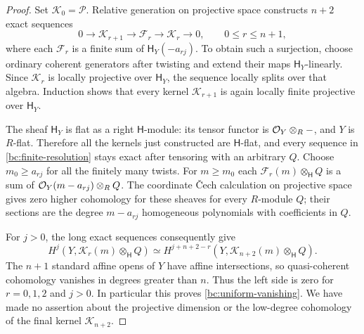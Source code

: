 \begin{proof}
Set $\mathcal K_0=\mathcal P$.  Relative generation on projective space
constructs $n+2$ exact sequences
\begin{equation}\label{bc:finite-resolution}
 0\longrightarrow\mathcal K_{r+1}\longrightarrow\mathcal F_r
   \longrightarrow\mathcal K_r\longrightarrow0,
 \qquad 0\le r\le n+1,
\end{equation}
where each $\mathcal F_r$ is a finite sum of $\mathsf H_Y(-a_{rj})$.
To obtain such a surjection, choose ordinary coherent generators after
twisting and extend their maps $\mathsf H_Y$-linearly.  Since
$\mathcal K_r$ is locally projective over $\mathsf H_Y$, the sequence
locally splits over that algebra.  Induction shows that every kernel
$\mathcal K_{r+1}$ is again locally finite projective over
$\mathsf H_Y$.

The sheaf $\mathsf H_Y$ is flat as a right $\mathsf H$-module: its tensor
functor is $\mathcal O_Y\otimes_R-$, and $Y$ is $R$-flat.  Therefore all the
kernels just constructed are $\mathsf H$-flat, and every sequence in
\eqref{bc:finite-resolution} stays exact after tensoring with an
arbitrary $Q$.  Choose $m_0\ge a_{rj}$ for all the finitely many twists.
For $m\ge m_0$ each $\mathcal F_r(m)\otimes_{\mathsf H}Q$ is a sum of
$\mathcal O_Y(m-a_{rj})\otimes_RQ$.  The coordinate \v{C}ech calculation on
projective space gives zero higher cohomology for these sheaves for
every $R$-module $Q$; their sections are the degree $m-a_{rj}$
homogeneous polynomials with coefficients in $Q$.

For $j>0$, the long exact sequences consequently give
\begin{equation}\label{bc:dimension-shift}
 H^j(Y,\mathcal K_r(m)\otimes_{\mathsf H}Q)
 \simeq
 H^{j+n+2-r}(Y,\mathcal K_{n+2}(m)\otimes_{\mathsf H}Q).
\end{equation}
The $n+1$ standard affine opens of $Y$ have affine intersections, so
quasi-coherent cohomology vanishes in degrees greater than $n$.
Thus the left side is zero for $r=0,1,2$ and $j>0$.
In particular this proves \eqref{bc:uniform-vanishing}.  We have made
no assertion about the projective dimension or the low-degree
cohomology of the final kernel $\mathcal K_{n+2}$.


\end{proof}
